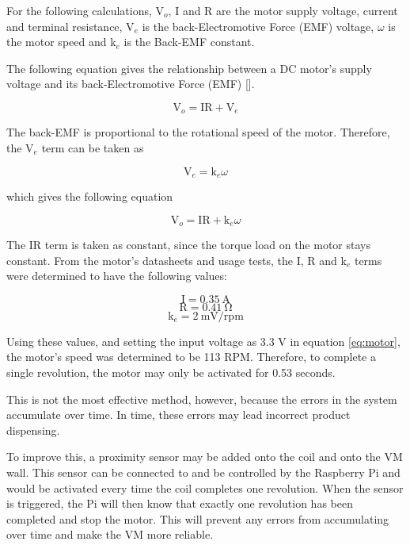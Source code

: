 For the following calculations, V$_o$, I and R are the motor supply voltage, current and
terminal resistance, V$_e$ is the back-Electromotive Force (EMF) voltage, $\omega$ is
the motor speed and k$_e$ is the Back-EMF constant.

The following equation gives the relationship between a DC motor's supply
voltage and its back-Electromotive Force (EMF) [\cite{article:motor-calc}].

\[ \mathrm{V}_o = \mathrm{IR} + \mathrm{V}_e\]

The back-EMF is proportional to the rotational speed of the motor. Therefore,
the V$_e$ term can be taken as

\[ \mathrm{V}_e = \mathrm{k}_e\omega\]

which gives the following equation

\begin{equation}
 \label{eq:motor}
 \mathrm{V}_o = \mathrm{IR} + \mathrm{k}_e\omega
\end{equation}

The IR term is taken as constant, since the torque load on the motor stays constant.
From the motor's datasheets and usage tests, the I, R and k$_e$ terms were
determined to have the following values:

\[\mathrm{I} = 0.35\mathrm{\ A}\]
\[\mathrm{R} = 0.41\mathrm{\ \Omega}\]
\[ \mathrm{k}_e = 2 \mathrm{\ mV/rpm}\]

Using these values, and setting the input voltage as 3.3 V in equation
\ref{eq:motor}, the motor's speed was determined to be 113 RPM. Therefore, to
complete a single revolution, the motor may only be activated for 0.53 seconds. 

This is not the most effective method, however, because the errors in the system
accumulate over time. In time, these errors may lead incorrect product
dispensing. 

To improve this, a proximity sensor may be added onto the coil and onto the
VM wall. This sensor can be connected to and be controlled by the
Raspberry Pi and would be activated every time the coil completes one
revolution. When the sensor is triggered, the Pi will then know that exactly
one revolution has been completed and stop the motor. This will prevent any
errors from accumulating over time and make the VM more reliable. 
